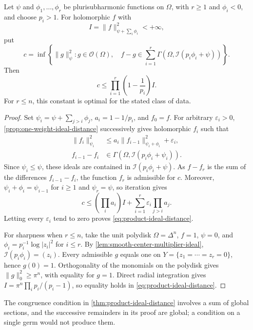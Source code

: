 \begin{theorem}\label{thm:product-ideal-distance}
Let $\psi$ and $\phi_1,\ldots,\phi_r$ be plurisubharmonic functions on $\Omega$, with $r\geq1$ and $\phi_i<0$, and choose $p_i>1$. For holomorphic $f$ with
\[
 I=\|f\|_{\psi+\sum_i\phi_i}^2<+\infty,
\]
put
\[
 c=\inf\left\{\|g\|_\psi^2:g\in\mathcal O(\Omega),\quad
 f-g\in\sum_{i=1}^r\Gamma(\Omega,\mathcal I(p_i\phi_i+\psi))\right\}.
\]
Then
\begin{equation}\label{eq:product-ideal-distance}
 c\leq\prod_{i=1}^r\left(1-\frac1{p_i}\right)I.
\end{equation}
For $r\leq n$, this constant is optimal for the stated class of data.
\end{theorem}
\begin{proof}
Set $\psi_i=\psi+\sum_{j>i}\phi_j$, $a_i=1-1/p_i$, and $f_0=f$. For arbitrary $\varepsilon_i>0$, \cref{prop:one-weight-ideal-distance} successively gives holomorphic $f_i$ such that
\[
 \begin{aligned}
 \|f_i\|_{\psi_i}^2&\leq a_i\|f_{i-1}\|_{\psi_i+\phi_i}^2+\varepsilon_i,\\
 f_{i-1}-f_i&\in\Gamma(\Omega,\mathcal I(p_i\phi_i+\psi_i)).
 \end{aligned}
\]
Since $\psi_i\leq\psi$, these ideals are contained in $\mathcal I(p_i\phi_i+\psi)$. As $f-f_r$ is the sum of the differences $f_{i-1}-f_i$, the function $f_r$ is admissible for $c$. Moreover, $\psi_i+\phi_i=\psi_{i-1}$ for $i\geq1$ and $\psi_r=\psi$, so iteration gives
\[
 c\leq\left(\prod_i a_i\right)I
          +\sum_{i=1}^r\varepsilon_i\prod_{j>i}a_j.
\]
Letting every $\varepsilon_i$ tend to zero proves \eqref{eq:product-ideal-distance}.

For sharpness when $r\leq n$, take the unit polydisk $\Omega=\Delta^n$, $f=1$, $\psi=0$, and $\phi_i=p_i^{-1}\log|z_i|^2$ for $i\leq r$. By \cref{lem:smooth-center-multiplier-ideal}, $\mathcal I(p_i\phi_i)=(z_i)$. Every admissible $g$ equals one on $Y=\{z_1=\cdots=z_r=0\}$, hence $g(0)=1$. Orthogonality of the monomials on the polydisk gives $\|g\|_0^2\geq\pi^n$, with equality for $g=1$. Direct radial integration gives $I=\pi^n\prod_i p_i/(p_i-1)$, so equality holds in \eqref{eq:product-ideal-distance}.
\end{proof}

The congruence condition in \cref{thm:product-ideal-distance} involves a sum of global sections, and the successive remainders in its proof are global; a condition on a single germ would not produce them.
